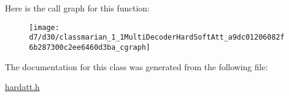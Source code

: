 Here is the call graph for this function\+:
\nopagebreak
\begin{figure}[H]
\begin{center}
\leavevmode
\texttt{[image: d7/d30/classmarian\_1\_1MultiDecoderHardSoftAtt\_a9dc01206082f6b287300c2ee6460d3ba\_cgraph]}
\end{center}
\end{figure}




The documentation for this class was generated from the following file\+:\begin{DoxyCompactItemize}
\item 
\hyperlink{hardatt_8h}{hardatt.\+h}\end{DoxyCompactItemize}
